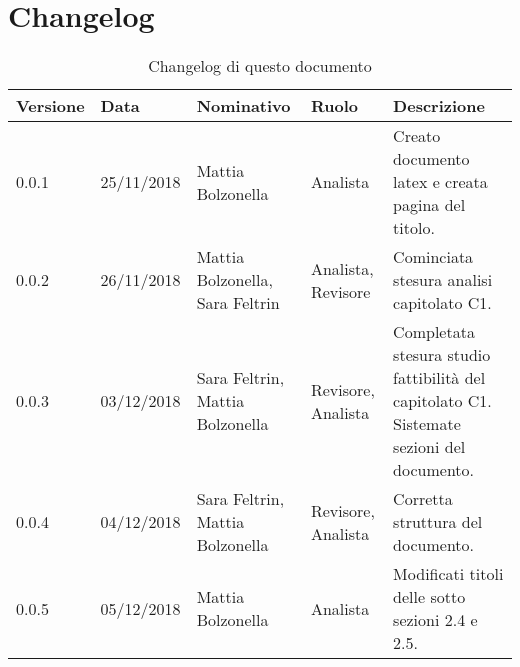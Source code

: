 \section{Changelog}
\begin{table}[tbph]
        \centering
        \begin{tabularx}{\textwidth}{|l|l|l|l|X|}
                \hline
                \textbf{Versione} & \textbf{Data} & \textbf{Nominativo}  & \textbf{Ruolo} & 
                \textbf{Descrizione}\\
              	\hline \hline
              	0.0.1 & 25/11/2018 & Mattia Bolzonella & Analista & Creato documento latex e creata pagina 
              	del titolo. \\
              	\hline
              	0.0.2 & 26/11/2018 & Mattia Bolzonella, Sara Feltrin & Analista, Revisore &Cominciata stesura analisi
               	capitolato C1.\\
              	\hline
              	0.0.3 & 03/12/2018 & Sara Feltrin, Mattia Bolzonella & Revisore, Analista &Completata
              	stesura studio fattibilità del capitolato C1. Sistemate sezioni del documento. \\
              	\hline
              	0.0.4 & 04/12/2018 & Sara Feltrin, Mattia Bolzonella &Revisore, Analista &Corretta struttura del 
              	documento. \\
              	\hline
              		0.0.5 & 05/12/2018 & Mattia Bolzonella & Analista &Modificati titoli delle sotto 
              		sezioni 2.4 e 2.5. \\
                \hline
              	
        \end{tabularx}
        \caption{Changelog di questo documento}
\end{table}